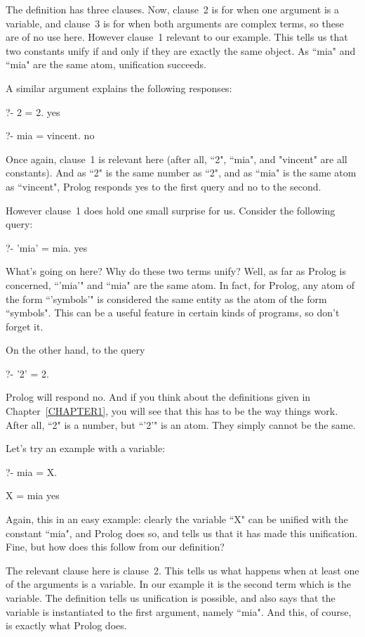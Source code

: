 The definition has three clauses. Now, clause~2 is for when one
argument is a variable, and clause~3 is for when both arguments are
complex terms, so these are of no use here. However clause~1 
relevant to our example.  This tells us that two constants unify if
and only if they are exactly the same object. As ``mia" and ``mia"
are the same atom, unification succeeds.

A similar argument explains the following responses:
\begin{LPNcodedisplay}
?- 2 = 2.
yes

?- mia = vincent.
no
\end{LPNcodedisplay}
%
Once again, clause~1 is relevant here (after all, ``2", ``mia", and
"vincent" are all constants). And as ``2" is the same number as ``2",
and as ``mia" is  the same atom as ``vincent", Prolog
responds yes to the first query and no to the second.

However clause~1 does hold one small surprise for us. Consider the
following query:
\begin{LPNcodedisplay}
?- 'mia' = mia.
yes
\end{LPNcodedisplay}
%
What's going on here? Why do these two terms unify? Well, as far as
Prolog is concerned, ``'mia'" and ``mia" are the same atom. In fact, for
Prolog, any atom of the form ``'symbols'" is considered the same entity
as the atom of the form ``symbols". This can be a useful feature in
certain kinds of programs, so don't forget it.

On the other hand, to the query
\begin{LPNcodedisplay}
?- '2' = 2.
\end{LPNcodedisplay}
%
Prolog will respond no. And if you think about the definitions given
in Chapter~\ref{CHAPTER1}, you will see that this has to be the way
things work.  After all, ``2" is a number, but ``'2'" is an atom. They
simply cannot be the same.

Let's try an example with a variable:
\begin{LPNcodedisplay}
?- mia = X.

X = mia
yes
\end{LPNcodedisplay}
%
Again, this in an easy example: clearly the variable ``X" can be
unified with the constant ``mia", and Prolog does so, and tells us that
it has made this unification. Fine, but how does this follow from our
definition?

The relevant clause here is clause~2. This tells us what happens when
at least one of the arguments is a variable. In our example it is the
second term which is the variable. The definition tells us unification
is possible, and also says that the variable is instantiated to the
first argument, namely ``mia". And this, of course, is exactly what
Prolog does.

